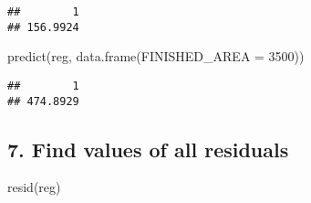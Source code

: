 \documentclass[
]{article}
\newenvironment{Shaded}{\begin{snugshade}}{\end{snugshade}}
\newcommand{\AttributeTok}[1]{\textcolor[rgb]{0.77,0.63,0.00}{#1}}
\newcommand{\CommentTok}[1]{\textcolor[rgb]{0.56,0.35,0.01}{\textit{#1}}}
\newcommand{\DecValTok}[1]{\textcolor[rgb]{0.00,0.00,0.81}{#1}}
\newcommand{\FunctionTok}[1]{\textcolor[rgb]{0.00,0.00,0.00}{#1}}
\newcommand{\NormalTok}[1]{#1}
\begin{document}
\begin{Shaded}
\end{Shaded}

\begin{verbatim}
##        1 
## 156.9924
\end{verbatim}

\begin{Shaded}
\begin{Highlighting}[]
\FunctionTok{predict}\NormalTok{(reg, }\FunctionTok{data.frame}\NormalTok{(}\AttributeTok{FINISHED\_AREA =} \DecValTok{3500}\NormalTok{))}
\end{Highlighting}
\end{Shaded}

\begin{verbatim}
##        1 
## 474.8929
\end{verbatim}

\hypertarget{find-values-of-all-residuals}{%
\subsection{7. Find values of all
residuals}\label{find-values-of-all-residuals}}

\begin{Shaded}
\begin{Highlighting}[]
\FunctionTok{resid}\NormalTok{(reg)}
\end{Highlighting}
\end{Shaded}
\end{document}
